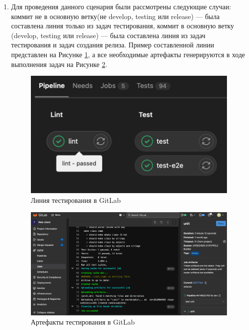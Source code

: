 \begin{enumerate}
    \item Для проведения данного сценария были рассмотрены следующие случаи:
    коммит не в основную ветку(не develop, testing или release) --- была составлена линия только из задач тестирования,
    коммит в основную ветку (develop, testing или release) --- была составлена линия из задач тестирования и задач создания релиза.
    Пример составленной линии представлен на Рисунке \ref{fig:qa-pipeline}, а все необходимые артефакты генерируются в ходе выполнения задач на Рисунке \ref{fig:qa-artifacts}.

    \begin{figure}[ht]
        \centering
        \includegraphics[scale=0.8]{src/figures/qa-pipeline}
        \caption{Линия тестирования в GitLab}
        \label{fig:qa-pipeline}
    \end{figure}

    \begin{figure}[ht]
        \centering
        \includegraphics[scale=0.4]{src/figures/qa-artifacts}
        \caption{Артефакты тестирования в GitLab}
        \label{fig:qa-artifacts}
    \end{figure}


\end{enumerate}
